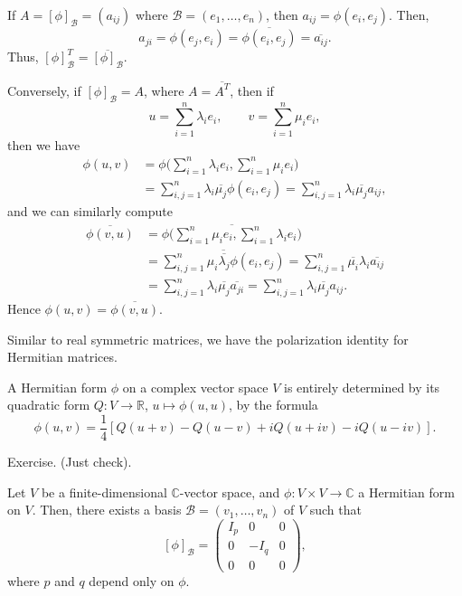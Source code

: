 \documentclass[12pt]{article}
\begin{document}
\begin{proofbox}
	If $A = [\phi]_{\mathcal{B}} = (a_{ij})$ where $\mathcal{B} = (e_1, \ldots, e_n)$, then $a_{ij} = \phi(e_i, e_j)$. Then,
	\[
	a_{ji} = \phi(e_j, e_i) = \overline{\phi(e_i, e_j)} = \overline{a_{ij}}
	.\]
	Thus, $[\phi]_{\mathcal{B}}^{T} = \overline{[\phi]_{\mathcal{B}}}$.

	Conversely, if $[\phi]_{\mathcal{B}} = A$, where $A = \overline{A^{T}}$, then if
	\[
	u = \sum_{i = 1}^{n} \lambda_i e_i, \qquad v = \sum_{i = 1}^{n} \mu_i e_i
	,\]
	then we have
	\begin{align*}
		\phi(u, v) &= \phi \Biggl( \sum_{i = 1}^{n} \lambda_i e_i , \sum_{i = 1}^{n} \mu_i e_i \Biggr) \\
			   &= \sum_{i,j = 1}^{n} \lambda_i \overline{\mu_j} \phi(e_i, e_j) = \sum_{i, j = 1}^{n} \lambda_i \overline{\mu_j} a_{ij},
	\end{align*}
	and we can similarly compute
	\begin{align*}
		\overline{\phi(v, u)} &= \overline{\phi \Biggl( \sum_{i = 1}^{n} \mu_i e_i, \sum_{i = 1}^{n} \lambda_i e_i \Biggr)} \\
		&= \overline{\sum_{i,j = 1}^{n} \mu_i \overline{\lambda_j}\phi(e_i, e_j)} = \sum_{i,j = 1}^{n} \overline{\mu_i}\lambda_i \overline{a_{ij}} \\
		&= \sum_{i, j = 1}^{n} \lambda_i \overline{\mu_j} \overline{a_{ji}} = \sum_{i, j = 1}^{n}\lambda_i \overline{\mu_j} a_{ij}.
	\end{align*}
	Hence $\phi(u, v) = \overline{\phi(v, u)}$.
\end{proofbox}

Similar to real symmetric matrices, we have the polarization identity for Hermitian matrices.

\begin{proposition}
	A Hermitian form $\phi$ on a complex vector space $V$ is entirely determined by its quadratic form $Q : V \to \mathbb{R}$, $u \mapsto \phi(u, u)$, by the formula
	\[
		\phi(u, v) = \frac{1}{4} [Q(u+v) - Q(u-v) + iQ(u+iv) - iQ(u-iv)]
	.\]
\end{proposition}

\begin{proofbox}
	Exercise. (Just check).
\end{proofbox}

\begin{theorem}
	Let $V$ be a finite-dimensional $\mathbb{C}$-vector space, and $\phi : V \times V \to \mathbb{C}$ a Hermitian form on $V$. Then, there exists a basis $\mathcal{B} = (v_1, \ldots, v_n)$ of $V$ such that
	\[
		[\phi]_{\mathcal{B}} =
		\begin{pmatrix}
			I_p & 0 & 0 \\
			    0 & -I_q & 0 \\
			0 & 0 & 0
		\end{pmatrix}
	,\]
	where $p$ and $q$ depend only on $\phi$.
\end{theorem}
\end{document}
